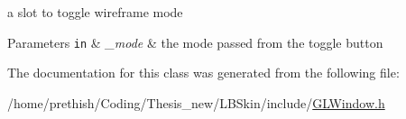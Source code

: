 a slot to toggle wireframe mode 


\begin{DoxyParams}[1]{Parameters}
\mbox{\tt in}  & {\em \-\_\-mode} & the mode passed from the toggle button \\
\hline
\end{DoxyParams}


The documentation for this class was generated from the following file\-:\begin{DoxyCompactItemize}
\item 
/home/prethish/\-Coding/\-Thesis\-\_\-new/\-L\-B\-Skin/include/\hyperlink{_g_l_window_8h}{G\-L\-Window.\-h}\end{DoxyCompactItemize}
